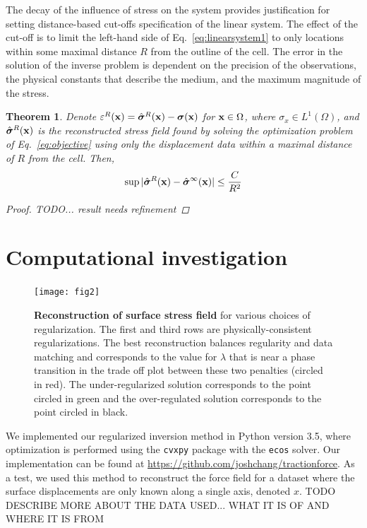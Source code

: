 \documentclass[aps,prl,reprint,twocolumn,groupedaddress,showpacs]{revtex4-1}
\newtheorem{thm}{Theorem}%
\newcommand{\bsigma}{{\boldsymbol\sigma}}
\def\x{{\bf x}}
\begin{document}
The decay of the influence of stress on the system provides justification for setting distance-based
cut-offs specification of the linear system. The effect of the cut-off is to limit the left-hand side of Eq.~\ref{eq:linearsystem1} to only locations within some maximal distance $R$ from the outline of the cell.
The error in the solution of the inverse problem is dependent on the precision of the observations,
 the physical constants that describe the medium, and the maximum magnitude of the stress.

\begin{thm}
\label{thm:main}
Denote $\varepsilon^R(\x) = \hat{\bsigma}^R(\x) - \bsigma(\x)$ for $\x\in\Omega$, where $\sigma_{x}\in L^1(\Omega)$, and $\hat{\bsigma}^R(\x)$ is the reconstructed stress field found by solving the optimization problem of Eq.~\ref{eq:objective} using only the displacement data within a maximal distance of $R$ from the cell. Then,
\begin{equation}
\sup \vert \hat{\bsigma}^R(\x) - \hat{\bsigma}^\infty(\x) \vert \leq \frac{C}{R^2}
\end{equation}

\begin{proof}
TODO... result needs refinement

\end{proof}

\end{thm}


\section{Computational investigation}

\begin{figure}
\texttt{[image: fig2]}
\caption{\textbf{Reconstruction of surface stress field} for various choices of regularization. The first and third rows are physically-consistent regularizations. The best reconstruction balances regularity and data matching and corresponds to the value for $\lambda$ that is near a phase transition in the trade off plot between these two penalties (circled in red). The under-regularized solution corresponds to the point circled in green and the over-regulated solution corresponds to the point circled in black.}
\label{fig:fig2}
\end{figure}

We implemented our regularized inversion method in Python version 3.5, where optimization is performed using the \texttt{cvxpy} package with the \texttt{ecos} solver.  Our implementation can be found at \url{https://github.com/joshchang/tractionforce}. As a test, we used this method to reconstruct the force field for a dataset where the surface displacements are only known along a single axis, denoted $x$. TODO DESCRIBE MORE ABOUT THE DATA USED... WHAT IT IS OF AND WHERE IT IS FROM
\end{document}
